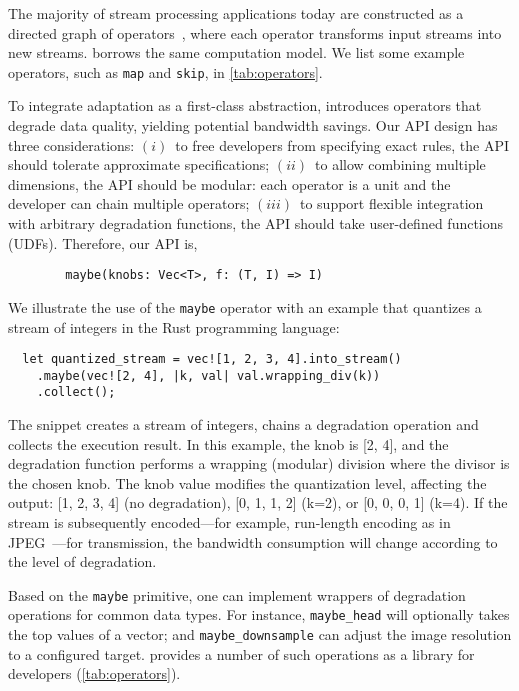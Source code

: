 The majority of stream processing applications today are constructed as a
directed graph of operators~\cite{toshniwal2014storm, zaharia2013discretized},
where each operator transforms input streams into new streams. \sysname{}
borrows the same computation model. We list some example operators, such as
\texttt{map} and \texttt{skip}, in \autoref{tab:operators}.

To integrate adaptation as a first-class abstraction, \sysname{} introduces \maybe{} operators
that degrade data quality, yielding potential bandwidth savings.
Our API design has three considerations:
$(i)$~to free developers from specifying exact rules, the API should tolerate
approximate specifications; $(ii)$~to allow combining multiple dimensions, the API
should be modular: each operator is a unit and the developer can chain multiple
operators; $(iii)$~to support flexible integration with arbitrary degradation
functions, the API should take user-defined functions (UDFs). Therefore, our API
is,

\vspace{-2pt}
\begin{lstlisting}
        maybe(knobs: Vec<T>, f: (T, I) => I)
\end{lstlisting}

We illustrate the use of the \texttt{maybe} operator with an example that
quantizes a stream of integers in the Rust programming language:

\vspace{-2pt}
\begin{lstlisting}
  let quantized_stream = vec![1, 2, 3, 4].into_stream()
    .maybe(vec![2, 4], |k, val| val.wrapping_div(k))
    .collect();
\end{lstlisting}

The snippet creates a stream of integers, chains a degradation operation and
collects the execution result. In this example, the knob is [2, 4], and the
degradation function performs a wrapping (modular) division where the divisor is
the chosen knob. The knob value modifies the quantization level, affecting the
output: [1, 2, 3, 4] (no degradation), [0, 1, 1, 2] (k=2), or [0, 0, 0, 1]
(k=4). If the stream is subsequently encoded---for example, run-length encoding
as in JPEG~\cite{wallace1992jpeg}---for transmission, the bandwidth consumption
will change according to the level of degradation.

Based on the \texttt{maybe} primitive, one can implement wrappers of degradation
operations for common data types. For instance, \texttt{maybe\_head} will
optionally takes the top values of a vector; and
\texttt{maybe\_downsample} can adjust the image resolution to a
configured target. \sysname{} provides a number of such operations as a library for
developers (\autoref{tab:operators}).

